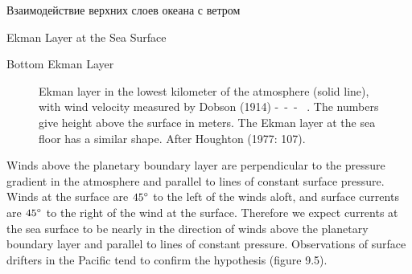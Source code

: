 \begin{chapter}{Взаимодействие верхних слоев океана с ветром}
\begin{section}{Ekman Layer at the Sea Surface}
\begin{paragraph}{Bottom Ekman Layer}
\begin{figure}[b!]
\caption{Ekman layer in the lowest kilometer of the
atmosphere (solid line), with wind velocity measured by Dobson (1914)
-\ -\ - \ . The numbers give height above the surface in meters. The
Ekman layer at the sea floor has a similar shape. After Houghton
(1977: 107).}
\end{figure}
%

Winds above the planetary boundary layer are perpendicular to the
pressure gradient in the atmosphere and parallel to lines of constant
surface pressure.  Winds at the surface are ${45}^\circ$ to the left
of the winds aloft, and surface currents are ${45}^\circ$ to the
right of the wind at the surface. Therefore we expect currents at the
sea surface to be nearly in the direction of winds above the planetary
boundary layer and parallel to lines of constant
pressure. Observations of surface drifters
in the Pacific tend to confirm the hypothesis (figure 9.5).
%


\end{paragraph}
\end{section}
\end{chapter}
